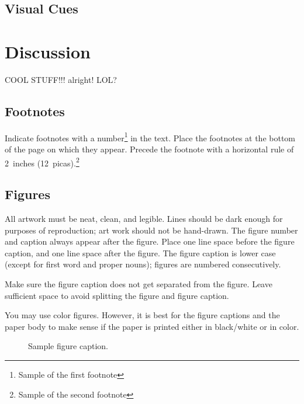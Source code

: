 \documentclass{article} %
\begin{document}
\subsection{Visual Cues}


\section{Discussion}

















\newpage

COOL \LaTeXe STUFF!!! alright! LOL?

\subsection{Footnotes}

Indicate footnotes with a number\footnote{Sample of the first footnote} in the
text. Place the footnotes at the bottom of the page on which they appear.
Precede the footnote with a horizontal rule of 2~inches
(12~picas).\footnote{Sample of the second footnote}

\subsection{Figures}

All artwork must be neat, clean, and legible. Lines should be dark
enough for purposes of reproduction; art work should not be
hand-drawn. The figure number and caption always appear after the
figure. Place one line space before the figure caption, and one line
space after the figure. The figure caption is lower case (except for
first word and proper nouns); figures are numbered consecutively.

Make sure the figure caption does not get separated from the figure.
Leave sufficient space to avoid splitting the figure and figure caption.

You may use color figures. 
However, it is best for the
figure captions and the paper body to make sense if the paper is printed
either in black/white or in color.
\begin{figure}[h]
\begin{center}
\fbox{\rule[-.5cm]{0cm}{4cm} \rule[-.5cm]{4cm}{0cm}}
\end{center}
\caption{Sample figure caption.}
\end{figure}
\end{document}
